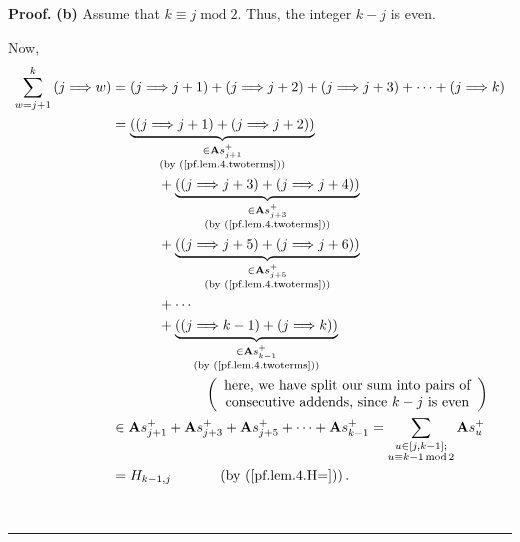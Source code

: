 \documentclass[numbers=enddot,12pt,final,onecolumn,notitlepage]{scrartcl}%
\theoremstyle{definition}
\newenvironment{proof}[1][Proof]{\noindent\textbf{#1.} }{\ \rule{0.5em}{0.5em}}
\let\sumnonlimits\sum
\renewcommand{\sum}{\sumnonlimits\limits}
\begin{document}
\begin{proof}
\textbf{(b)} Assume that $k\equiv j\operatorname{mod}2$. Thus, the integer
$k-j$ is even.

Now,%
\begin{align}
\sum_{w=j+1}^{k}\left(  j\Longrightarrow w\right)   &  =\left(
j\Longrightarrow j+1\right)  +\left(  j\Longrightarrow j+2\right)  +\left(
j\Longrightarrow j+3\right)  +\cdots+\left(  j\Longrightarrow k\right)
\nonumber\\
&  =\underbrace{\left(  \left(  j\Longrightarrow j+1\right)  +\left(
j\Longrightarrow j+2\right)  \right)  }_{\substack{\in\mathbf{A}s_{j+1}%
^{+}\\\text{(by (\ref{pf.lem.4.twoterms}))}}}\nonumber\\
&  \ \ \ \ \ \ \ \ \ \ +\underbrace{\left(  \left(  j\Longrightarrow
j+3\right)  +\left(  j\Longrightarrow j+4\right)  \right)  }_{\substack{\in
\mathbf{A}s_{j+3}^{+}\\\text{(by (\ref{pf.lem.4.twoterms}))}}}\nonumber\\
&  \ \ \ \ \ \ \ \ \ \ +\underbrace{\left(  \left(  j\Longrightarrow
j+5\right)  +\left(  j\Longrightarrow j+6\right)  \right)  }_{\substack{\in
\mathbf{A}s_{j+5}^{+}\\\text{(by (\ref{pf.lem.4.twoterms}))}}}\nonumber\\
&  \ \ \ \ \ \ \ \ \ \ +\cdots\nonumber\\
&  \ \ \ \ \ \ \ \ \ \ +\underbrace{\left(  \left(  j\Longrightarrow
k-1\right)  +\left(  j\Longrightarrow k\right)  \right)  }_{\substack{\in
\mathbf{A}s_{k-1}^{+}\\\text{(by (\ref{pf.lem.4.twoterms}))}}}\nonumber\\
&  \ \ \ \ \ \ \ \ \ \ \ \ \ \ \ \ \ \ \ \ \left(
\begin{array}
[c]{c}%
\text{here, we have split our sum into pairs of}\\
\text{consecutive addends, since }k-j\text{ is even}%
\end{array}
\right) \nonumber\\
&  \in\mathbf{A}s_{j+1}^{+}+\mathbf{A}s_{j+3}^{+}+\mathbf{A}s_{j+5}^{+}%
+\cdots+\mathbf{A}s_{k-1}^{+}=\sum_{\substack{u\in\left[  j,k-1\right]
;\\u\equiv k-1\operatorname{mod}2}}\mathbf{A}s_{u}^{+}\nonumber\\
&  =H_{k-1,j}\ \ \ \ \ \ \ \ \ \ \left(  \text{by (\ref{pf.lem.4.H=})}\right)
. \label{pf.lem.4.2.b.1}%
\end{align}



\end{proof}
\end{document}
